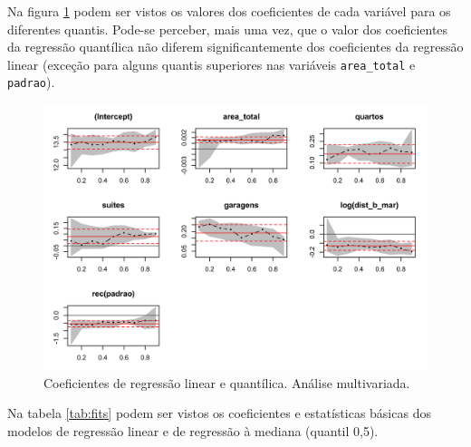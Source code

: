 \documentclass[a4paper, 12pt]{article}
\begin{document}
Na figura \ref{fig:coefs} podem ser vistos os valores dos coeficientes
de cada variável para os diferentes quantis. Pode-se perceber, mais uma
vez, que o valor dos coeficientes da regressão quantílica não diferem
significantemente dos coeficientes da regressão linear (exceção para
alguns quantis superiores nas variáveis \texttt{area\_total} e
\texttt{padrao}).

\begin{figure}[H]

{\centering \includegraphics[width=1\linewidth]{images/coefs-1} 

}

\caption{Coeficientes de regressão linear e quantílica. Análise multivariada.}\label{fig:coefs}
\end{figure}

Na tabela \ref{tab:fits} podem ser vistos os coeficientes e estatísticas
básicas dos modelos de regressão linear e de regressão à mediana
(quantil 0,5).
\end{document}
